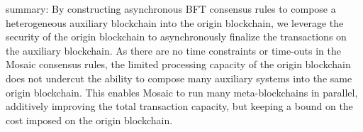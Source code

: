 \documentclass[12pt,a4paper]{article}
\begin{document}
summary:
By constructing asynchronous BFT consensus rules to compose a heterogeneous auxiliary blockchain into the origin blockchain, we leverage the security of the origin blockchain to asynchronously finalize the transactions on the auxiliary blockchain.
As there are no time constraints or time-outs in the Mosaic consensus rules, the limited processing capacity of the origin blockchain does not undercut the ability to compose many auxiliary systems into the same origin blockchain.
This enables Mosaic to run many meta-blockchains in parallel, additively improving the total transaction capacity, but keeping a bound on the cost imposed on the origin blockchain.
%
%
\end{document}
